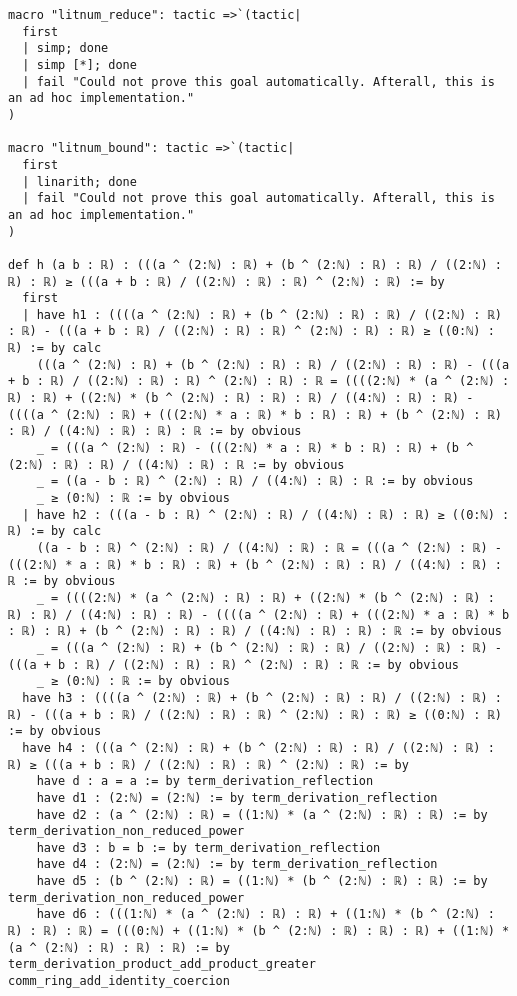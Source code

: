 \documentclass{article}
\begin{document}
\begin{tcolorbox}[colback=white!10, width=\linewidth]
\begin{lstlisting}[language=Lean4]
macro "litnum_reduce": tactic =>`(tactic|
  first
  | simp; done
  | simp [*]; done
  | fail "Could not prove this goal automatically. Afterall, this is an ad hoc implementation."
)

macro "litnum_bound": tactic =>`(tactic|
  first
  | linarith; done
  | fail "Could not prove this goal automatically. Afterall, this is an ad hoc implementation."
)

def h (a b : ℝ) : (((a ^ (2:ℕ) : ℝ) + (b ^ (2:ℕ) : ℝ) : ℝ) / ((2:ℕ) : ℝ) : ℝ) ≥ (((a + b : ℝ) / ((2:ℕ) : ℝ) : ℝ) ^ (2:ℕ) : ℝ) := by
  first
  | have h1 : ((((a ^ (2:ℕ) : ℝ) + (b ^ (2:ℕ) : ℝ) : ℝ) / ((2:ℕ) : ℝ) : ℝ) - (((a + b : ℝ) / ((2:ℕ) : ℝ) : ℝ) ^ (2:ℕ) : ℝ) : ℝ) ≥ ((0:ℕ) : ℝ) := by calc
    (((a ^ (2:ℕ) : ℝ) + (b ^ (2:ℕ) : ℝ) : ℝ) / ((2:ℕ) : ℝ) : ℝ) - (((a + b : ℝ) / ((2:ℕ) : ℝ) : ℝ) ^ (2:ℕ) : ℝ) : ℝ = ((((2:ℕ) * (a ^ (2:ℕ) : ℝ) : ℝ) + ((2:ℕ) * (b ^ (2:ℕ) : ℝ) : ℝ) : ℝ) / ((4:ℕ) : ℝ) : ℝ) - ((((a ^ (2:ℕ) : ℝ) + (((2:ℕ) * a : ℝ) * b : ℝ) : ℝ) + (b ^ (2:ℕ) : ℝ) : ℝ) / ((4:ℕ) : ℝ) : ℝ) : ℝ := by obvious
    _ = (((a ^ (2:ℕ) : ℝ) - (((2:ℕ) * a : ℝ) * b : ℝ) : ℝ) + (b ^ (2:ℕ) : ℝ) : ℝ) / ((4:ℕ) : ℝ) : ℝ := by obvious
    _ = ((a - b : ℝ) ^ (2:ℕ) : ℝ) / ((4:ℕ) : ℝ) : ℝ := by obvious
    _ ≥ (0:ℕ) : ℝ := by obvious
  | have h2 : (((a - b : ℝ) ^ (2:ℕ) : ℝ) / ((4:ℕ) : ℝ) : ℝ) ≥ ((0:ℕ) : ℝ) := by calc
    ((a - b : ℝ) ^ (2:ℕ) : ℝ) / ((4:ℕ) : ℝ) : ℝ = (((a ^ (2:ℕ) : ℝ) - (((2:ℕ) * a : ℝ) * b : ℝ) : ℝ) + (b ^ (2:ℕ) : ℝ) : ℝ) / ((4:ℕ) : ℝ) : ℝ := by obvious
    _ = ((((2:ℕ) * (a ^ (2:ℕ) : ℝ) : ℝ) + ((2:ℕ) * (b ^ (2:ℕ) : ℝ) : ℝ) : ℝ) / ((4:ℕ) : ℝ) : ℝ) - ((((a ^ (2:ℕ) : ℝ) + (((2:ℕ) * a : ℝ) * b : ℝ) : ℝ) + (b ^ (2:ℕ) : ℝ) : ℝ) / ((4:ℕ) : ℝ) : ℝ) : ℝ := by obvious
    _ = (((a ^ (2:ℕ) : ℝ) + (b ^ (2:ℕ) : ℝ) : ℝ) / ((2:ℕ) : ℝ) : ℝ) - (((a + b : ℝ) / ((2:ℕ) : ℝ) : ℝ) ^ (2:ℕ) : ℝ) : ℝ := by obvious
    _ ≥ (0:ℕ) : ℝ := by obvious
  have h3 : ((((a ^ (2:ℕ) : ℝ) + (b ^ (2:ℕ) : ℝ) : ℝ) / ((2:ℕ) : ℝ) : ℝ) - (((a + b : ℝ) / ((2:ℕ) : ℝ) : ℝ) ^ (2:ℕ) : ℝ) : ℝ) ≥ ((0:ℕ) : ℝ) := by obvious
  have h4 : (((a ^ (2:ℕ) : ℝ) + (b ^ (2:ℕ) : ℝ) : ℝ) / ((2:ℕ) : ℝ) : ℝ) ≥ (((a + b : ℝ) / ((2:ℕ) : ℝ) : ℝ) ^ (2:ℕ) : ℝ) := by
    have d : a = a := by term_derivation_reflection
    have d1 : (2:ℕ) = (2:ℕ) := by term_derivation_reflection
    have d2 : (a ^ (2:ℕ) : ℝ) = ((1:ℕ) * (a ^ (2:ℕ) : ℝ) : ℝ) := by term_derivation_non_reduced_power
    have d3 : b = b := by term_derivation_reflection
    have d4 : (2:ℕ) = (2:ℕ) := by term_derivation_reflection
    have d5 : (b ^ (2:ℕ) : ℝ) = ((1:ℕ) * (b ^ (2:ℕ) : ℝ) : ℝ) := by term_derivation_non_reduced_power
    have d6 : (((1:ℕ) * (a ^ (2:ℕ) : ℝ) : ℝ) + ((1:ℕ) * (b ^ (2:ℕ) : ℝ) : ℝ) : ℝ) = (((0:ℕ) + ((1:ℕ) * (b ^ (2:ℕ) : ℝ) : ℝ) : ℝ) + ((1:ℕ) * (a ^ (2:ℕ) : ℝ) : ℝ) : ℝ) := by term_derivation_product_add_product_greater comm_ring_add_identity_coercion

\end{lstlisting}
\end{tcolorbox}
\end{document}
